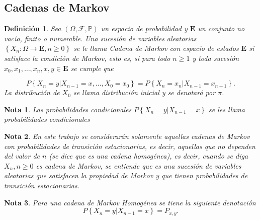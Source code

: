\documentclass{article}
\newtheorem{Def}{Definición}[section]
\newtheorem{Note}{Nota}[section]
\newcommand{\prob}{\mathbb{P}}
\numberwithin{equation}{section}
\begin{document}
\subsection*{Cadenas de Markov}

\begin{Def}
Sea $\left(\Omega,\mathcal{F},\prob\right)$ un espacio de probabilidad y $\mathbf{E}$ un conjunto no vac\'io, finito o numerable. Una sucesi\'on de variables aleatorias $\left\{X_{n}:\Omega\rightarrow\mathbf{E},n\geq0\right\}$ se le llama \textit{Cadena de Markov} con espacio de estados $\mathbf{E}$ si satisface la condici\'on de Markov, esto es, si para todo $n\geq1$ y toda sucesi\'on $x_{0},x_{1},\ldots,x_{n},x,y\in\mathbf{E}$ se cumple que 

\begin{equation}
P\left\{X_{n}=y|X_{n-1}=x,\ldots,X_{0}=x_{0}\right\}=P\left\{X_{n}=x_{n}|X_{n-1}=x_{n-1}\right\}.
\end{equation}
La distribuci\'on de $X_{0}$ se llama distribuci\'on inicial y se denotar\'a por $\pi$.
\end{Def}

\begin{Note}
Las probabilidades condicionales $P\left\{X_{n}=y|X_{n-1}=x\right\}$ se les llama \textit{probabilidades condicionales}
\end{Note}

\begin{Note}
En este trabajo se considerar\'an solamente aquellas cadenas de Markov con probabilidades de transici\'on estacionarias, es decir, aquellas que no dependen del valor de $n$ (se dice que es una cadena homog\'enea), es decir, cuando se diga $X_{n},n\geq0$ es cadena de Markov, se entiende que es una sucesi\'on de variables aleatorias que satisfacen la propiedad de Markov y que tienen probabilidades de transici\'on estacionarias.
\end{Note}

\begin{Note}
Para una cadena de Markov Homog\'enea se tiene la siguiente denotaci\'on
\begin{equation}
P\left\{X_{n}=y|X_{n-1}=x\right\}=P_{x,y}.
\end{equation}
\end{Note}
\end{document}

